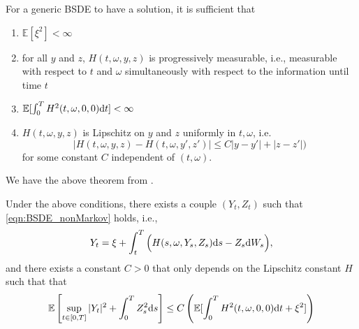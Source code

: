 \documentclass[11pt]{book}
\newcommand{\dt}{\text{\normalfont d}t}
\newcommand{\ds}{\text{\normalfont d}s}
\newcommand{\dW}{\text{\normalfont d}W}
\begin{document}
For a generic BSDE to have a solution, it is sufficient that 
\begin{enumerate}[label= \bfseries \arabic*)]
    \item $\mathbb{E}[\xi^2]<\infty$
    \item for all $y$ and $z$, $H(t,\omega,y,z)$ is progressively measurable, i.e., measurable with respect to $t$ and $\omega$ simultaneously with respect to the information until time $t$
    \item $\mathbb{E}[\int_0^T H^2(t,\omega,0,0)\dt]<\infty$
    \item $H(t,\omega,y,z)$ is Lipschitz on $y$ and $z$ uniformly in $t,\omega$, i.e.
    \[
    |H(t,\omega,y,z)-H(t,\omega,y',z')|
    \le C|y-y'|+|z-z'|)
    \]
    for some constant $C$ independent of $(t,\omega)$.
\end{enumerate}
We have the above theorem from \cite[Proposition~1.1]{pardoux98}.
\begin{thm}
Under the above conditions,  there exists a couple $(Y_t,Z_t)$ such that \eqref{eqn:BSDE_nonMarkov} holds, i.e.,
\begin{equation}
Y_t=\xi+\int_t^T \Big(H(s,\omega,Y_s,Z_s){{\ds}}-Z_s\dW_s\Big),
\end{equation}
and there exists a constant $C>0$ that only depends on the Lipschitz constant $H$ such that that
\begin{equation}
\mathbb{E}\left[\sup_{t\in[0,T]}|Y_t|^2+\int_0^TZ_s^2{{\ds}}\right]\le C\left(\mathbb{E}[\int_0^TH^2(t,\omega,0,0)\dt + \xi^2]\right)
\end{equation}
\end{thm}
\end{document}
